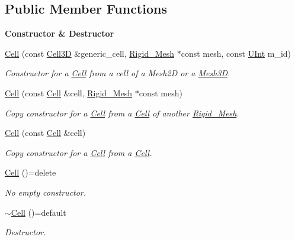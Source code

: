 \subsection*{Public Member Functions}
\begin{Indent}{\bf Constructor \& Destructor}\par
\begin{DoxyCompactItemize}
\item 
\hyperlink{classFVCode3D_1_1Rigid__Mesh_1_1Cell_ad8a3fb94b11638f328a9f647c5a73c4c}{Cell} (const \hyperlink{classFVCode3D_1_1Rigid__Mesh_a0895aca7f04d8fc41dd933640735bbcf}{Cell3D} \&generic\+\_\+cell, \hyperlink{classFVCode3D_1_1Rigid__Mesh}{Rigid\+\_\+\+Mesh} $\ast$const mesh, const \hyperlink{namespaceFVCode3D_a4bf7e328c75d0fd504050d040ebe9eda}{U\+Int} m\+\_\+id)
\begin{DoxyCompactList}\small\item\em Constructor for a \hyperlink{classFVCode3D_1_1Rigid__Mesh_1_1Cell}{Cell} from a cell of a Mesh2D or a \hyperlink{classFVCode3D_1_1Mesh3D}{Mesh3D}. \end{DoxyCompactList}\item 
\hyperlink{classFVCode3D_1_1Rigid__Mesh_1_1Cell_a0b2887ea5ac27020284c71606c92de05}{Cell} (const \hyperlink{classFVCode3D_1_1Rigid__Mesh_1_1Cell}{Cell} \&cell, \hyperlink{classFVCode3D_1_1Rigid__Mesh}{Rigid\+\_\+\+Mesh} $\ast$const mesh)
\begin{DoxyCompactList}\small\item\em Copy constructor for a \hyperlink{classFVCode3D_1_1Rigid__Mesh_1_1Cell}{Cell} from a \hyperlink{classFVCode3D_1_1Rigid__Mesh_1_1Cell}{Cell} of another \hyperlink{classFVCode3D_1_1Rigid__Mesh}{Rigid\+\_\+\+Mesh}. \end{DoxyCompactList}\item 
\hyperlink{classFVCode3D_1_1Rigid__Mesh_1_1Cell_a1e7438ebc1453aca2217103c9af60c9d}{Cell} (const \hyperlink{classFVCode3D_1_1Rigid__Mesh_1_1Cell}{Cell} \&cell)
\begin{DoxyCompactList}\small\item\em Copy constructor for a \hyperlink{classFVCode3D_1_1Rigid__Mesh_1_1Cell}{Cell} from a \hyperlink{classFVCode3D_1_1Rigid__Mesh_1_1Cell}{Cell}. \end{DoxyCompactList}\item 
\hyperlink{classFVCode3D_1_1Rigid__Mesh_1_1Cell_aaa5efd433c30628772159010d1858d16}{Cell} ()=delete
\begin{DoxyCompactList}\small\item\em No empty constructor. \end{DoxyCompactList}\item 
\hyperlink{classFVCode3D_1_1Rigid__Mesh_1_1Cell_a28eca7ff80658602fe4439d4e2832ce0}{$\sim$\+Cell} ()=default
\begin{DoxyCompactList}\small\item\em Destructor. \end{DoxyCompactList}\end{DoxyCompactItemize}
\end{Indent}

